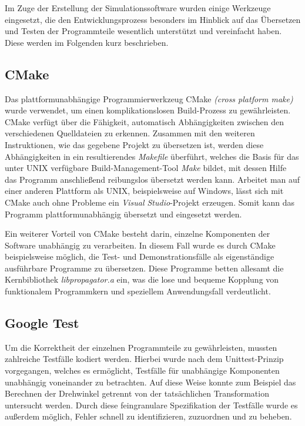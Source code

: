 Im Zuge der Erstellung der Simulationssoftware wurden einige Werkzeuge eingesetzt, die den Entwicklungsprozess besonders im Hinblick
auf das \"Ubersetzen und Testen der Programmteile wesentlich unterst\"utzt und vereinfacht haben.
Diese werden im Folgenden kurz beschrieben.

\subsection{CMake}
\label{sec:cmake}

Das plattformunabh\"angige Programmierwerkzeug CMake \textit{(cross platform make)} wurde verwendet, um einen komplikationslosen
Build-Prozess zu gew\"ahrleisten. CMake verf\"ugt \"uber die F\"ahigkeit, automatisch Abh\"angigkeiten zwischen den verschiedenen
Quelldateien zu erkennen. Zusammen mit den weiteren Instruktionen, wie das gegebene Projekt zu \"ubersetzen ist, werden diese
Abh\"angigkeiten in ein resultierendes \textit{Makefile} \"uberf\"uhrt, welches die Basis f\"ur das unter UNIX verf\"ugbare
Build-Management-Tool \textit{Make} bildet, mit dessen Hilfe das Programm anschlie{\ss}end reibungslos \"ubersetzt werden kann.
Arbeitet man auf einer anderen Plattform als UNIX, beispielsweise auf Windows, l\"asst sich mit
CMake auch ohne Probleme ein \textit{Visual Studio}-Projekt erzeugen. Somit kann das Programm plattformunabh\"angig \"ubersetzt und
eingesetzt werden.

Ein weiterer Vorteil von CMake besteht darin, einzelne Komponenten der Software unabh\"angig zu verarbeiten. In diesem Fall wurde
es durch CMake beispielsweise m\"oglich, die Test- und Demonstrationsf\"alle als eigenst\"andige ausf\"uhrbare Programme zu
\"ubersetzen. Diese Programme betten allesamt die Kernbibliothek \textit{libpropagator.a} ein, was die lose und bequeme Kopplung
von funktionalem Programmkern und speziellem Anwendungsfall verdeutlicht.

\subsection{Google Test}

Um die Korrektheit der einzelnen Programmteile zu gew\"ahrleisten, mussten zahlreiche Testf\"alle kodiert werden. Hierbei wurde
nach dem Unittest-Prinzip vorgegangen, welches es erm\"oglicht, Testf\"alle f\"ur unabh\"angige Komponenten unabh\"angig voneinander
zu betrachten. Auf diese Weise konnte zum Beispiel das Berechnen der Drehwinkel getrennt von der tats\"achlichen Transformation
untersucht werden. Durch diese feingranulare Spezifikation der Testf\"alle wurde es au{\ss}erdem m\"oglich, Fehler schnell zu
identifizieren, zuzuordnen und zu beheben.

